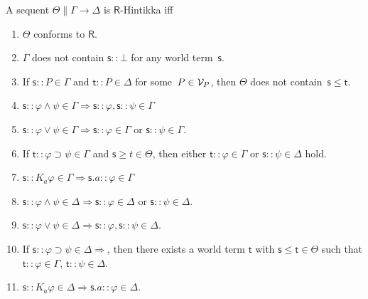 \begin{definition}
 A sequent $\Theta\parallel \Gamma\longrightarrow\Delta$ is $\mathsf R$-Hintikka
 iff
 \begin{enumerate}
  \item $\Theta$ conforms to $\mathsf R$.
  \item $\Gamma$ does not contain $\mathsf s::\bot$ for any world
	term~$\mathsf s$.
  \item If $\mathsf s::P\in \Gamma$ and $\mathsf t::P\in\Delta$ for
	some~$P\in\mathcal V_P$\!, then
	$\Theta$ does not contain~$\mathsf s\le \mathsf t$.
  \item $\mathsf s::\varphi\wedge\psi\in\Gamma\Longrightarrow
	\mathsf s::\varphi,\mathsf s::\psi\in\Gamma$
  \item $\mathsf s::\varphi\vee\psi\in\Gamma
	\Longrightarrow \mathsf s::\varphi\in\Gamma$ or
	$\mathsf s::\psi\in\Gamma$.
  \item If $\mathsf t::\varphi\supset\psi
	\in\Gamma$ and $\mathsf s\ge t\in \Theta$,
	then 
	either
	$\mathsf t::\varphi\in\Gamma$ or
	$\mathsf s::\psi\in\Delta$ hold.
  \item $\mathsf s::K_a\varphi\in\Gamma
	\Longrightarrow \mathsf s.a::\varphi\in\Gamma$
  \item $\mathsf s::\varphi\wedge\psi
	\in\Delta\Longrightarrow \mathsf
	s::\varphi\in\Delta$
	or $\mathsf s::\psi\in\Delta$.
  \item $\mathsf s::\varphi\vee\psi\in\Delta
	\Longrightarrow \mathsf s::\varphi, \mathsf s::\psi\in
	\Delta$.
  \item If $\mathsf s::\varphi\supset\psi\in\Delta\Longrightarrow$, then
	there exists a world term $\mathsf t$ with $\mathsf
	s\le \mathsf t\in\Theta$ such that
	$\mathsf t::\varphi\in\Gamma$, $\mathsf t::\psi\in\Delta$.
  \item $\mathsf s:: K_a\varphi\in\Delta\Longrightarrow
	\mathsf s.a::\varphi\in\Delta$.
 \end{enumerate}
\end{definition}

